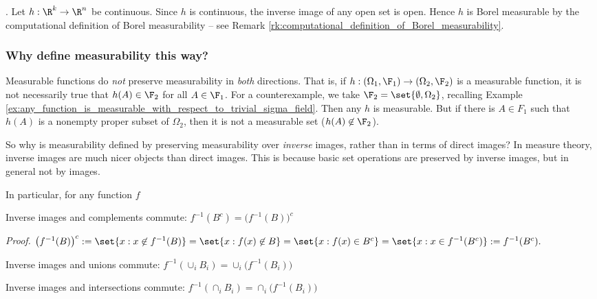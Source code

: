 \documentclass{article} %
\begin{document}
\begin{example}{}. Let $h : \R^k \to \R^n$ be continuous.  Since $h$ is continuous, the inverse image of any open set is open. Hence $h$ is Borel measurable by the computational definition of Borel measurability -- see Remark \ref{rk:computational_definition_of_Borel_measurability}.
\end{example}

\subsubsection{Why define measurability this way?} \label{sec:why_define_measurability_this_way}

Measurable functions do \textit{not} preserve measurability in \textit{both} directions. That is, if $h : (\Omega_1, \F_1) \to (\Omega_2, \F_2)$ is a measurable function, it is not necessarily true that $h(A) \in \F_2$ for all $A \in \F_1$.  For a counterexample, we take $\F_2 = \set{\emptyset, \Omega_2}$, recalling Example \ref{ex:any_function_is_measurable_with_respect_to_trivial_sigma_field}.   Then any $h$ is measurable.  But if there is $A \in F_1$ such that $h(A)$ is a nonempty proper subset of $\Omega_2$, then it is not a measurable set ($h(A) \not\in \F_2$). 

So why is measurability defined by preserving measurability over \textit{inverse} images, rather than in terms of direct images?  In measure theory, inverse images are much nicer objects than direct images.  This is because basic set operations are preserved by inverse images, but in general not by images.  

In particular, for any function $f$
\begin{alphabate}
\item Inverse images and complements commute: $f^{-1}(B^c) = \big(f^{-1}(B)\big)^c$	

\textit{Proof.} $ \big(f^{-1}(B)\big)^c := \set{x : x \not\in f^{-1}(B) } = \set{x : f(x) \not\in B } = \set{x: f(x) \in B^c} = \set{x: x \in f^{-1}(B^c)} := f^{-1}(B^c).$

\item Inverse images and unions commute: $f^{-1}(\cup_i B_i) = \cup_i \big(f^{-1}(B_i)\big)$
\item Inverse images and intersections commute: $f^{-1}(\cap_i B_i) = \cap_i \big(f^{-1}(B_i)\big)$	
\end{alphabate}
\end{document}
